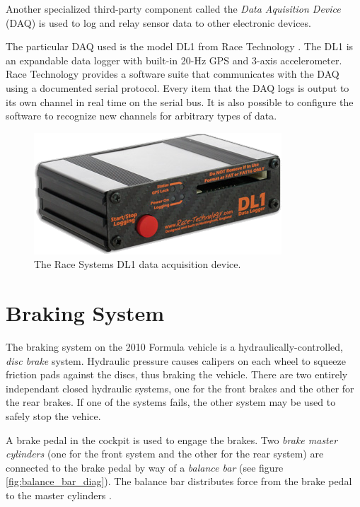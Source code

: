 Another specialized third-party component called the \emph{Data Aquisition Device} (DAQ) is used to log and relay sensor data to other electronic devices.

The particular DAQ used is the model DL1 from Race Technology \cite{DL1Dsheet}. The DL1 is an expandable data logger with built-in 20-Hz GPS and 3-axis accelerometer. Race Technology provides a software suite that communicates with the DAQ using a documented serial protocol. Every item that the DAQ logs is output to its own channel in real time on the serial bus. It is also possible to configure the software to recognize new channels for arbitrary types of data. 

\begin{figure}[H]
	\centering
	 	\includegraphics[scale=0.5]{figures/dl1.png}
    \caption{The Race Systems DL1 data acquisition device.}
    \label{fig:dl1_product}
\end{figure}

\section{Braking System}
\label{sec:brake-overview}

The braking system on the 2010 Formula vehicle is a hydraulically-controlled, \emph{disc brake} system. Hydraulic pressure causes calipers on each wheel to squeeze friction pads against the discs, thus braking the vehicle. There are two entirely independant closed hydraulic systems, one for the front brakes and the other for the rear brakes. If one of the systems fails, the other system may be used to safely stop the vehice.

A brake pedal in the cockpit is used to engage the brakes. Two \emph{brake master cylinders} (one for the front system and the other for the rear system) are connected to the brake pedal by way of a \emph{balance bar} (see figure \ref{fig:balance_bar_diag}). The balance bar distributes force from the brake pedal to the master cylinders \cite{TiltonBrakeBias}. 


